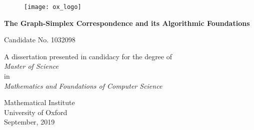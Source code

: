 \begin{titlepage}
	\vspace*{2cm}
	\begin{figure}
		\centering 
		\texttt{[image: ox\_logo]}
	\end{figure}
	
	\begin{center}
		\begin{adjustwidth}{7em}{7em}
			\centering 
					{\bf \large The Graph-Simplex Correspondence and its Algorithmic Foundations}\\
			\end{adjustwidth}
		\vspace{3cm}
		Candidate No. 1032098\\
		\vspace{1.5cm}
		\begin{adjustwidth}{8em}{8em}
			\centering 
					A dissertation presented in candidacy for the degree of \\
					\emph{Master of Science} \\
					in \\
					\emph{Mathematics and Foundations of Computer Science}
			\end{adjustwidth}
		\vspace{1.5cm}
		Mathematical Institute\\
		University of  Oxford\\
		September, 2019
	\end{center}
\end{titlepage}
